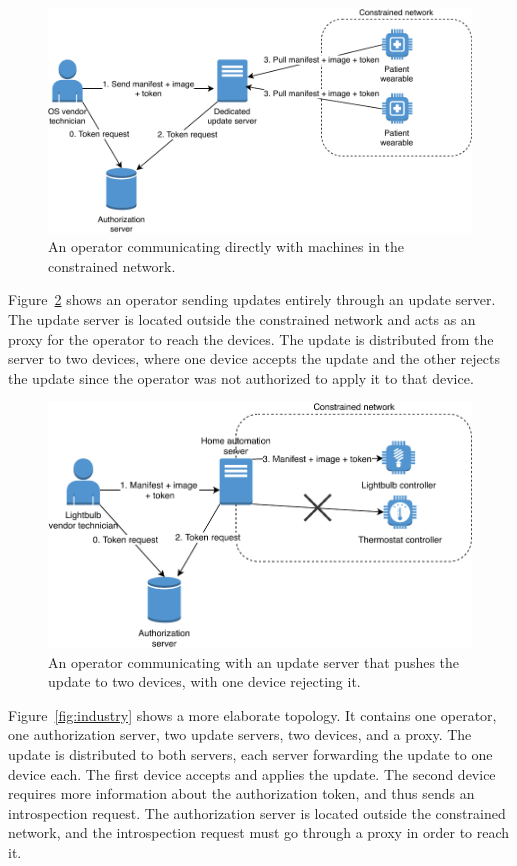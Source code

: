 \documentclass[0-thesis.tex]{subfiles}
\begin{document}
\begin{figure}
    \caption{An operator communicating directly with machines in the constrained network.}
    \label{fig:elderly-home}
    \includegraphics{images/use-case-elderly-home.pdf}
\end{figure}

Figure~\ref{fig:smart-home} shows an operator sending updates entirely through an
update server. The update server is located outside the constrained network and acts as an
proxy for the operator to reach the devices. The update is distributed from the server to
two devices, where one device accepts the update and the other rejects the update since
the operator was not authorized to apply it to that device.

\begin{figure}
    \caption{An operator communicating with an update server that pushes the update to two
                devices, with one device rejecting it.}
    \label{fig:smart-home}
    \includegraphics{images/use-case-smart-home.pdf}
\end{figure}

Figure~\ref{fig:industry} shows a more elaborate topology. It contains one
operator, one authorization server, two update servers, two devices, and a proxy. The
update is distributed to both servers, each server forwarding the update to one device
each. The first device accepts and applies the update. The second device requires more
information about the authorization token, and thus sends an introspection request. The
authorization server is located outside the constrained network, and the introspection
request must go through a proxy in order to reach it.
\end{document}
